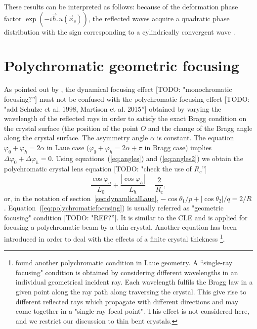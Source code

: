 \documentclass[preprint]{iucr}              %
\newcommand{\todo}[1]{{\color{red}[TODO: "#1'']}}
\newcommand{\inred}[1]{{\color{red}#1}}
\begin{document}
These results can be interpreted as follows: because of the deformation phase factor $\exp(-i\vec h. u(\vec x_s))$, the reflected waves acquire a quadratic phase distribution with the sign corresponding to a cylindrically convergent wave \inred{\cite{Honkanen2018}}.



\section{Polychromatic \inred{geometric} focusing}
\label{sec:polychromatic}

As pointed out by \cite{CK}, the dynamical focusing effect \todo{monochromatic focusing?} must not be confused with the polychromatic focusing effect \cite{handbook} \todo{add Schulze et al. 1998, Martison et al. 2015} obtained by varying the wavelength of the reflected rays in order to satisfy the exact Bragg condition on the crystal surface (the position of the point $O$ and the change of the Bragg angle along the crystal surface. The asymmetry angle $\alpha$ is constant. The equation $\varphi_0+\varphi_h=2\alpha$ in Laue case ($\varphi_0+\varphi_h=2\alpha+\pi$ in Bragg case) implies $\Delta\varphi_0+\Delta\varphi_h=0$. Using equations~(\ref{eq:angles}) and  (\ref{eq:angles2}) we obtain the polychromatic crystal lens equation \todo{check the use of $R_c$}
\begin{equation}
\label{eq:polychromaticfocusing}
\frac{{\cos {\varphi _o}}}{{{L_0}}} + \frac{{\left| {\cos {\varphi _h}} \right|}}{{{L_h}}} = \frac{2}{R_c},
\end{equation}
or, in the notation of section~\ref{sec:dynamlicalLaue}, $-\cos\theta_1/p + |\cos\theta_2|/q=2/R$. Equation~(\ref{eq:polychromaticfocusing}) is usually referred as "geometric focusing" condition \todo{REF?}. It is similar to the CLE and is applied for focusing a polychromatic beam by a thin crystal. Another equation has been introduced in order to deal with the effects of a finite crystal thickness \cite{PengQi}\footnote{\cite{PengQi} found another polychromatic condition in Laue geometry. A ``single-ray focusing" condition is obtained by considering different wavelengths in an individual geometrical incident ray. Each wavelength fulfils the Bragg law in a given point along the ray path along traversing the crystal. This give rise to different reflected rays which propagate with different directions and may come together in a "single-ray focal point". This effect is not considered here, and we restrict our discussion to thin bent crystals. }.
\end{document}
